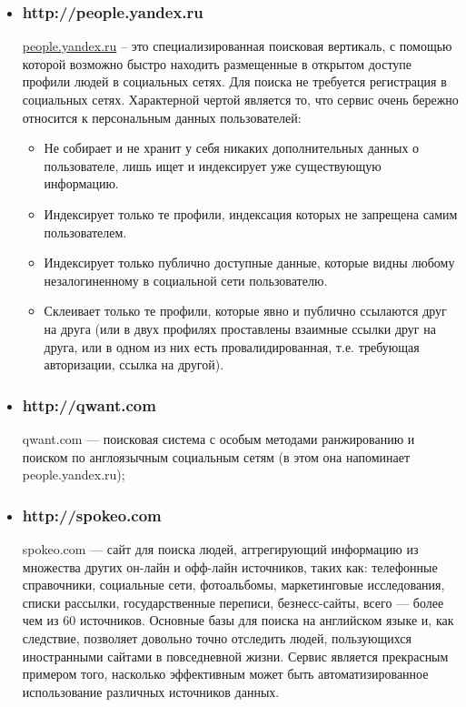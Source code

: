 \begin{itemize}

\item \subsubsection{http://people.yandex.ru} %
\url{people.yandex.ru} – это специализированная поисковая вертикаль, с помощью которой возможно быстро находить размещенные в открытом доступе профили людей в социальных сетях. Для поиска не требуется регистрация в социальных сетях. Характерной чертой является то, что сервис очень бережно относится к персональным данных пользователей:
\begin{itemize}
\item Не собирает и не хранит у себя никаких дополнительных данных о пользователе, лишь ищет и индексирует уже существующую информацию.
\item Индексирует только те профили, индексация которых не запрещена самим пользователем.
\item Индексирует только публично доступные данные, которые видны любому незалогиненному в социальной сети пользователю.
\item Склеивает только те профили, которые явно и публично ссылаются друг на друга (или в двух профилях проставлены взаимные ссылки друг на друга, или в одном из них есть провалидированная, т.е. требующая авторизации, ссылка на другой).
\end{itemize}
\item \subsubsection{http://qwant.com}
qwant.com — поисковая система с особым методами ранжированию и поиском по англоязычным социальным сетям (в этом она напоминает people.yandex.ru);
\item \subsubsection{http://spokeo.com}
spokeo.com — сайт для поиска людей, аггрегирующий информацию из множества других он-лайн и офф-лайн источников, таких как: телефонные справочники, социальные сети, фотоальбомы, маркетинговые исследования, списки рассылки, государственные переписи, безнесс-сайты, всего — более чем из 60 источников. Основные базы для поиска на английском языке и, как следствие, позволяет довольно точно отследить людей, пользующихся иностранными сайтами в повседневной жизни. Сервис является прекрасным примером того, насколько эффективным может быть автоматизированное использование различных источников данных.
\end{itemize}

